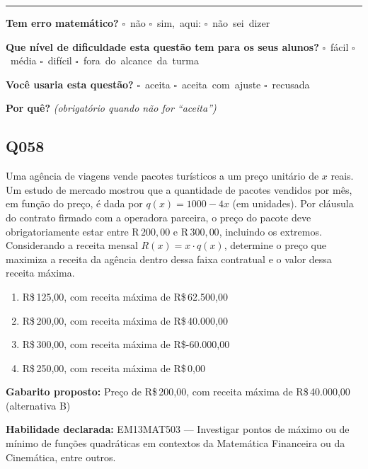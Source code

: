 \documentclass[11pt,a4paper]{article}
\begin{document}
\noindent\rule{\linewidth}{0.4pt}
\textbf{Tem erro matemático?}\quad
\mbox{$\square$~não} \quad \mbox{$\square$~sim, aqui:} \underline{\hspace{5cm}}
\quad \mbox{$\square$~não sei dizer}

\textbf{Que nível de dificuldade esta questão tem para os seus alunos?}\quad
\mbox{$\square$~fácil} \quad \mbox{$\square$~média} \quad
\mbox{$\square$~difícil} \quad \mbox{$\square$~fora do alcance da turma}

\textbf{Você usaria esta questão?}\quad
\mbox{$\square$~aceita} \quad \mbox{$\square$~aceita com ajuste} \quad
\mbox{$\square$~recusada}

\textbf{Por quê?} \emph{(obrigatório quando não for ``aceita'')}

\underline{\hspace{\linewidth}}

\underline{\hspace{\linewidth}}
\vspace{0.6em}

\begin{samepage}
\subsection*{Q058}
Uma agência de viagens vende pacotes turísticos a um preço unitário de $x$ reais. Um estudo de mercado mostrou que a quantidade de pacotes vendidos por mês, em função do preço, é dada por $q(x) = 1000 - 4x$ (em unidades). Por cláusula do contrato firmado com a operadora parceira, o preço do pacote deve obrigatoriamente estar entre R$\,200,00$ e R$\,300,00$, incluindo os extremos. Considerando a receita mensal $R(x) = x \cdot q(x)$, determine o preço que maximiza a receita da agência dentro dessa faixa contratual e o valor dessa receita máxima.
\begin{enumerate}[label=(\alph*),nosep,leftmargin=*]
\item R\$\,125,00, com receita máxima de R\$\,62.500,00
\item R\$\,200,00, com receita máxima de R\$\,40.000,00
\item R\$\,300,00, com receita máxima de R\$-60.000,00
\item R\$\,250,00, com receita máxima de R\$\,0,00
\end{enumerate}

\textbf{Gabarito proposto:} Preço de R\$\,200,00, com receita máxima de R\$\,40.000,00 (alternativa B)

\textbf{Habilidade declarada:} EM13MAT503 --- Investigar pontos de máximo ou de mínimo de funções quadráticas em contextos da Matemática Financeira ou da Cinemática, entre outros.
\end{samepage}
\end{document}

